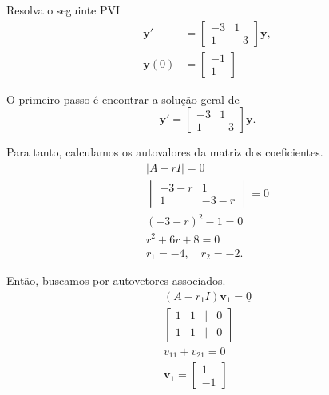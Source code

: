 \begin{exeresol}
  Resolva o seguinte PVI
  \begin{align}
    \pmb{y}' &=
    \begin{bmatrix}
      -3 & 1 \\
      1 & -3
    \end{bmatrix}\pmb{y},\\
    \pmb{y}(0) &=
    \begin{bmatrix}
      -1\\
      1
    \end{bmatrix}
  \end{align}
\end{exeresol}
\begin{resol}
  O primeiro passo é encontrar a solução geral de
  \begin{equation}
    \pmb{y}' = \begin{bmatrix}
      -3 & 1 \\
      1 & -3
    \end{bmatrix}\pmb{y}.
  \end{equation}

  Para tanto, calculamos os autovalores da matriz dos coeficientes.
  \begin{gather}
    |A-rI|=0\\
    \begin{vmatrix}
      -3-r & 1 \\
      1 & -3-r
    \end{vmatrix} = 0 \\
    (-3-r)^2-1=0 \\
    r^2+6r+8=0 \\
    r_1 = -4,\quad r_2=-2.
  \end{gather}

  Então, buscamos por autovetores associados.
  \begin{gather}
    (A-r_1I)\pmb{v}_1 = \underline{0} \\
    \begin{bmatrix}
      1 & 1 & | & 0\\
      1 & 1 & | & 0
    \end{bmatrix}\\
    v_{11}+v_{21}=0\\
    \pmb{v}_1 =
    \begin{bmatrix}
      1\\
      -1
    \end{bmatrix}
  \end{gather}


\end{resol}
